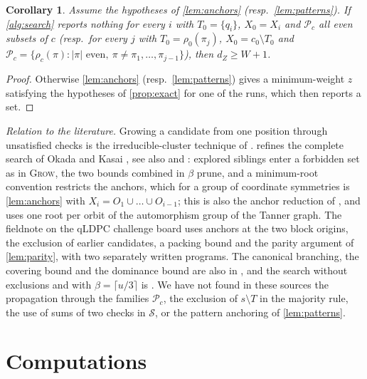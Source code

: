 \documentclass[11pt]{amsart}
\newtheorem{corollary}[theorem]{Corollary}
\theoremstyle{definition}
\theoremstyle{remark}
\begin{document}
\begin{corollary}\label{cor:runs}
Assume the hypotheses of \cref{lem:anchors} (resp.\ \cref{lem:patterns}). If \cref{alg:search} reports nothing for every $i$ with $T_0=\{q_i\}$, $X_0=X_i$ and $\mathcal P_c$ all even subsets of $c$ (resp.\ for every $j$ with $T_0=\rho_0(\pi_j)$, $X_0=c_0\setminus T_0$ and $\mathcal P_c=\{\rho_c(\pi):|\pi|\text{ even},\ \pi\ne\pi_1,\dots,\pi_{j-1}\}$), then $d_Z\ge W+1$.
\end{corollary}

\begin{proof}
Otherwise \cref{lem:anchors} (resp.\ \cref{lem:patterns}) gives a minimum-weight $z$ satisfying the hypotheses of \cref{prop:exact} for one of the runs, which then reports a set.
\end{proof}

\emph{Relation to the literature.} Growing a candidate from one position through unsatisfied checks is the irreducible-cluster technique of \cite[\S V]{DKP17}.  refines the complete search of Okada and Kasai \cite[\S V-A, Alg.~2, Lemma~2, Thm.~2]{OK26}, see also \cite[App.~B]{LOMK26} and \cite[App.~A]{Lee26b}: explored siblings enter a forbidden set as in \textsc{Grow}, the two bounds combined in $\beta$ prune, and a minimum-root convention restricts the anchors, which for a group of coordinate symmetries is \cref{lem:anchors} with $X_i=O_1\cup\dots\cup O_{i-1}$; this is also the anchor reduction of \cite[Suppl.\ Inf., \S5.3]{CGP26}, and \cite[App.~C.4]{Lee26} uses one root per orbit of the automorphism group of the Tanner graph. The fieldnote \cite{Cro26} on the qLDPC challenge board uses anchors at the two block origins, the exclusion of earlier candidates, a packing bound and the parity argument of \cref{lem:parity}, with two separately written programs. The canonical branching, the covering bound and the dominance bound are also in \cite[Suppl.\ Inf., eqs.~(S39), (S41), (S42)]{CGP26}, and the search without exclusions and with $\beta=\lceil u/3\rceil$ is \cite[Alg.~1, Thm.~4]{RD26}. We have not found in these sources the propagation through the families $\mathcal P_c$, the exclusion of $s\setminus T$ in the majority rule, the use of sums of two checks in $\mathcal S$, or the pattern anchoring of \cref{lem:patterns}.

\section{Computations}\label{sec:computations}
\end{document}
